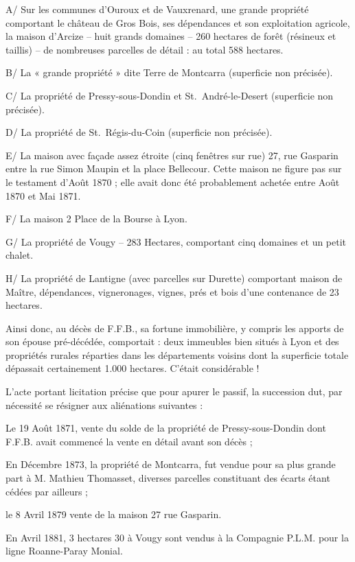 \documentclass[11pt,a4paper]{report}
\begin{document}
A/ Sur les communes d'Ouroux et de Vauxrenard, une grande propriété comportant le château de Gros Bois, ses dépendances et son exploitation agricole, la maison d'Arcize -- huit grands domaines -- 260 hectares de forêt (résineux et taillis) -- de nombreuses parcelles de détail : au total 588 hectares.

B/ La « grande propriété » dite Terre de Montcarra (superficie non précisée).

C/ La propriété de Pressy-sous-Dondin et St.~André-le-Desert (superficie non précisée).

D/ La propriété de St.~Régis-du-Coin (superficie non précisée).

E/ La maison avec façade assez étroite (cinq fenêtres sur rue) 27, rue Gasparin entre la rue Simon Maupin et la place Bellecour. Cette maison ne figure pas sur le testament d'Août 1870 ; elle avait donc été probablement achetée entre Août 1870 et Mai 1871.

F/ La maison 2 Place de la Bourse à Lyon.

G/ La propriété de Vougy -- 283 Hectares, comportant cinq domaines et un petit chalet.

H/ La propriété de Lantigne (avec parcelles sur Durette) comportant maison de Maître, dépendances, vigneronages, vignes, prés et bois d'une contenance de 23 hectares.

Ainsi donc, au décès de F.F.B., sa fortune immobilière, y compris les apports de son épouse pré-décédée, comportait : deux immeubles bien situés à Lyon et des propriétés rurales réparties dans les départements voisins dont la superficie totale dépassait certainement 1.000 hectares. C'était considérable !

L'acte portant licitation précise que pour apurer le passif, la succession dut, par nécessité se résigner aux aliénations suivantes :

Le 19 Août 1871, vente du solde de la propriété de Pressy-sous-Dondin dont F.F.B. avait commencé la vente en détail avant son décès ;

En Décembre 1873, la propriété de Montcarra, fut vendue pour sa plus grande part à M. Mathieu Thomasset, diverses parcelles constituant des écarts étant cédées par ailleurs ;

le 8 Avril 1879 vente de la maison 27 rue Gasparin.


En Avril 1881, 3 hectares 30 à Vougy sont vendus à la Compagnie P.L.M. pour la ligne Roanne-Paray Monial.
\end{document}
